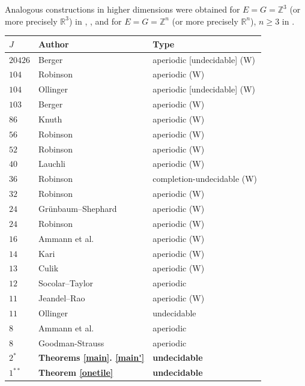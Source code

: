 \documentclass[reqno,a4paper,12pt]{amsart}
\numberwithin{equation}{section}
\numberwithin{figure}{section}
\def\R{\mathbb{R}}
\def\Z{\mathbb{Z}}
\renewcommand\geq{\geqslant}
\theoremstyle{plain}
\theoremstyle{definition}
\begin{document}
Analogous constructions in higher dimensions were obtained for $E=G=\Z^3$ (or more precisely $\R^3$) in \cite{danzer}, \cite{schmitt}, \cite{CK} and for $E=G=\Z^n$ (or more precisely $\R^n$), $n \geq 3$ in \cite{gs-higher}. 
\begin{table}[ht]
\centering
\begin{tabular}[t]{lll}
$J$ & Author & Type \\
\hline
$20426$ & Berger \cite{Ber} & aperiodic [undecidable] (W) \\
$104$ & Robinson \cite{ams} & aperiodic (W) \\
$104$ & Ollinger \cite{ollinger} & aperiodic [undecidable] (W) \\
$103$ & Berger \cite{Ber-thesis} & aperiodic (W) \\
$86$ & Knuth \cite{knuth} & aperiodic (W) \\
$56$ & Robinson \cite{R} & aperiodic (W) \\
$52$ & Robinson \cite{poizat} & aperiodic (W) \\
$40$ & Lauchli \cite{wang} & aperiodic (W) \\
$36$ & Robinson \cite{R} & completion-undecidable (W) \\
$32$ & Robinson \cite{grunbaum-shephard} & aperiodic (W) \\
$24$ & Gr\"unbaum--Shephard \cite{grunbaum-shephard} & aperiodic (W) \\
$24$ & Robinson \cite{grunbaum-shephard} & aperiodic (W) \\
$16$ & Ammann et al. \cite{ags} & aperiodic (W) \\
$14$ & Kari \cite{kari} & aperiodic (W) \\
$13$ & Culik \cite{culik} & aperiodic (W) \\
$12$ & Socolar--Taylor \cite{socolar-taylor} & aperiodic \\
$11$ & Jeandel--Rao \cite{jr} & aperiodic (W)\\
$11$ & Ollinger \cite{ollinger-2} & undecidable \\
$8$ & Ammann et al. \cite{ags} & aperiodic \\
$8$ & Goodman-Strauss \cite{goodman} & aperiodic \\
\hline
{\bf $2^*$} & {\bf Theorems \ref{main}. \ref{main'}} & {\bf undecidable}\\
{\bf $1^{**}$} & {\bf Theorem \ref{onetile}} & {\bf undecidable} \\
\hline
\end{tabular}

\end{table}
\end{document}
